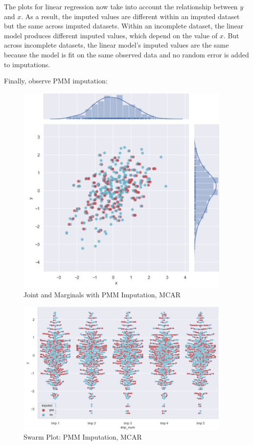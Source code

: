 \documentclass[12pt,oneside]{chicagocapstone}
\begin{document}
The plots for linear regression now take into account the relationship
between \(y\) and \(x\). As a result, the imputed values are different
within an imputed dataset but the same across imputed datasets. Within
an incomplete dataset, the linear model produces different imputed
values, which depend on the value of \(x\). But across incomplete
datasets, the linear model's imputed values are the same because the
model is fit on the same observed data and no random error is added to
imputations.

Finally, observe PMM imputation:
\begin{figure}

{\centering \includegraphics[width=400px]{figure/multi-pmm} 

}

\caption{Joint and Marginals with PMM Imputation, MCAR}\label{fig:multi-pmm}
\end{figure}
\begin{figure}

{\centering \includegraphics[width=400px]{figure/swarm-pmm} 

}

\caption{Swarm Plot: PMM Imputation, MCAR}\label{fig:swarm-pmm}
\end{figure}
\end{document}
